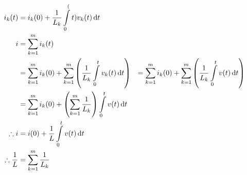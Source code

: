 \documentclass[fleqn, a4paper, 12pt, twoside]{article}
\theoremstyle{definition}
\theoremstyle{theorem}
\begin{document}
\begin{align*}
	i_k(t) &= i_k(0) + \dfrac{1}{L_k} \int\limits_{0}^(t) v_k(t) \dif t\\
	i &= \sum_{k = 1}^{m} i_k(t)\\
	&= \sum_{k = 1}^{m} i_k(0) + \sum_{k = 1}^{m} \left( \dfrac{1}{L_k} \int\limits_{0}^{t} v_k(t) \dif t \right)
	&= \sum_{k = 1}^{m} i_k(0) + \sum_{k = 1}^{m} \left( \dfrac{1}{L_k} \int\limits_{0}^{t} v(t) \dif t \right)\\
	&= \sum_{k = 1}^{m} i_k(0) + \left( \sum_{k = 1}^{m} \dfrac{1}{L_k} \right) \int\limits_{0}^{t} v(t) \dif t\\
	\therefore i &= i(0) + \dfrac{1}{L} \int\limits_{0}^{t} v(t) \dif t\\
	\therefore \dfrac{1}{L} &= \sum_{k = 1}^{m} \dfrac{1}{L_k}
\end{align*}
\end{document}
